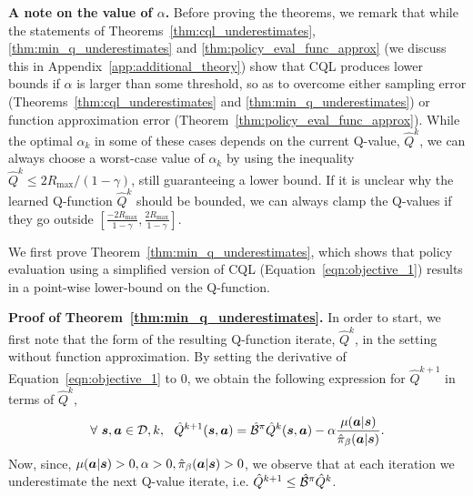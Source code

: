 \textbf{A note on the value of $\alpha$.} Before proving the theorems, we remark that while the statements of Theorems~\ref{thm:cql_underestimates}, \ref{thm:min_q_underestimates} and \ref{thm:policy_eval_func_approx} (we discuss this in Appendix~\ref{app:additional_theory}) show that CQL produces lower bounds if $\alpha$ is larger than some threshold, so as to overcome either sampling error (Theorems~\ref{thm:cql_underestimates} and \ref{thm:min_q_underestimates}) or function approximation error (Theorem~\ref{thm:policy_eval_func_approx}). While the optimal $\alpha_k$ in some of these cases depends on the current Q-value, $\hat{Q}^k$, we can always choose a worst-case value of $\alpha_k$ by using the inequality $\hat{Q}^k \leq 2 R_{\max}/(1 - \gamma)$, still guaranteeing a lower bound. If it is unclear why the learned Q-function $\hat{Q}^k$ should be bounded, we can always clamp the Q-values if they go outside $\left[ \frac{-2 R_{\max}}{1 - \gamma}, \frac{2 R_{\max}}{1 - \gamma} \right]$.

We first prove Theorem~\ref{thm:min_q_underestimates}, which shows that policy evaluation using a simplified version of CQL (Equation~\ref{eqn:objective_1}) results in a point-wise lower-bound on the Q-function. 

\textbf{Proof of Theorem~\ref{thm:min_q_underestimates}.} In order to start, we first note that the form of the resulting Q-function iterate, $\hat{Q}^k$, in the setting without function approximation. By setting the derivative of Equation~\ref{eqn:objective_1} to 0, we obtain the following expression for $\hat{Q}^{k+1}$ in terms of $\hat{Q}^k$,
\begin{equation}
    \forall~\boldsymbol{s}, \boldsymbol{a} \in \mathcal{D}, k, ~~ \hat{Q}^{k+1}(\boldsymbol{s}, \boldsymbol{a}) = \hat{\mathcal{B}}^\pi \hat{Q}^k(\boldsymbol{s}, \boldsymbol{a}) - \alpha \frac{\mu(\boldsymbol{a}|\boldsymbol{s})}{\hat{\pi}_\beta(\boldsymbol{a}|\boldsymbol{s})}.
    \label{eqn:q_expression_objective1}
\end{equation}
Now, since, $\mu(\boldsymbol{a}|\boldsymbol{s}) > 0, \alpha > 0, \hat{\pi}_\beta(\boldsymbol{a}|\boldsymbol{s}) > 0$, we observe that at each iteration we underestimate the next Q-value iterate, i.e. $\hat{Q}^{k+1} \leq \hat{\mathcal{B}}^\pi \hat{Q}^k$.

